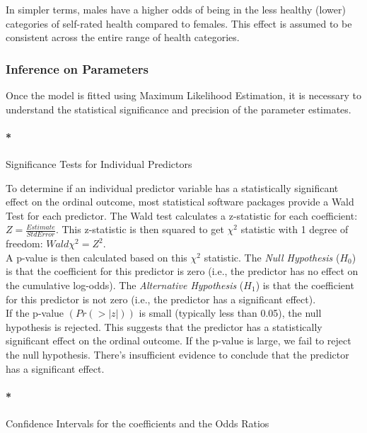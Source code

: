 \documentclass[
  letterpaper,
  DIV=11,
  numbers=noendperiod]{scrartcl}
\let\oldparagraph\paragraph
\renewcommand{\paragraph}[1]{\oldparagraph{#1}\mbox{}}
\begin{document}
In simpler terms, males have a higher odds of being in the less healthy
(lower) categories of self-rated health compared to females. This effect
is assumed to be consistent across the entire range of health
categories.

\hypertarget{inference-on-parameters}{%
\subsubsection*{Inference on Parameters}\label{inference-on-parameters}}

Once the model is fitted using Maximum Likelihood Estimation, it is
necessary to understand the statistical significance and precision of
the parameter estimates.

\hypertarget{significance-tests-for-individual-predictors}{%
\paragraph*{Significance Tests for Individual
Predictors}\label{significance-tests-for-individual-predictors}}

To determine if an individual predictor variable has a statistically
significant effect on the ordinal outcome, most statistical software
packages provide a Wald Test for each predictor. The Wald test
calculates a z-statistic for each coefficient:
\(Z= \frac{Estimate}{Std Error}\). This z-statistic is then squared to
get \(\chi^2\) statistic with 1 degree of freedom:
\(Wald\chi^2 = Z^2\).\\
A p-value is then calculated based on this \(\chi^2\) statistic. The
\emph{Null Hypothesis} (\(H_0\)) is that the coefficient for this
predictor is zero (i.e., the predictor has no effect on the cumulative
log-odds). The \emph{Alternative Hypothesis} (\(H_1\)) is that the
coefficient for this predictor is not zero (i.e., the predictor has a
significant effect).\\
If the p-value \((Pr(>|z|))\) is small (typically less than 0.05), the
null hypothesis is rejected. This suggests that the predictor has a
statistically significant effect on the ordinal outcome. If the p-value
is large, we fail to reject the null hypothesis. There's insufficient
evidence to conclude that the predictor has a significant effect.

\hypertarget{confidence-intervals-for-the-coefficients-and-the-odds-ratios}{%
\paragraph*{Confidence Intervals for the coefficients and the Odds
Ratios}\label{confidence-intervals-for-the-coefficients-and-the-odds-ratios}}
\end{document}

